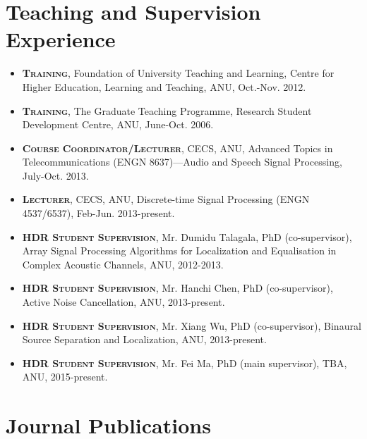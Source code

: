 \documentclass[10pt]{article}
\begin{document}
\section*{Teaching and Supervision Experience}
%
\begin{itemize}
%
\item \textsc{\textbf{Training}}, Foundation of University Teaching and Learning, Centre for Higher Education, Learning and Teaching, ANU, Oct.-Nov. 2012.

\item \textsc{\textbf{Training}}, The Graduate Teaching Programme, Research Student Development Centre, ANU,
June-Oct. 2006.

\item \textsc{\textbf{Course Coordinator/Lecturer}}, CECS, ANU, Advanced Topics in Telecommunications (ENGN 8637)---Audio and Speech Signal Processing, July-Oct. 2013.

\item \textsc{\textbf{Lecturer}}, CECS, ANU, Discrete-time Signal Processing (ENGN 4537/6537), Feb-Jun. 2013-present.

\item \textsc{\textbf{HDR Student Supervision}}, Mr. Dumidu Talagala, PhD (co-supervisor), Array Signal Processing Algorithms for Localization and Equalisation in Complex Acoustic Channels, ANU, 2012-2013.

\item \textsc{\textbf{HDR Student Supervision}}, Mr. Hanchi Chen, PhD (co-supervisor), Active Noise Cancellation, ANU, 2013-present.

\item \textsc{\textbf{HDR Student Supervision}}, Mr. Xiang Wu, PhD (co-supervisor), Binaural Source Separation and Localization, ANU, 2013-present.

\item \textsc{\textbf{HDR Student Supervision}}, Mr. Fei Ma, PhD (main supervisor), TBA, ANU, 2015-present.

\end{itemize}

\section*{Journal Publications}
\end{document}
